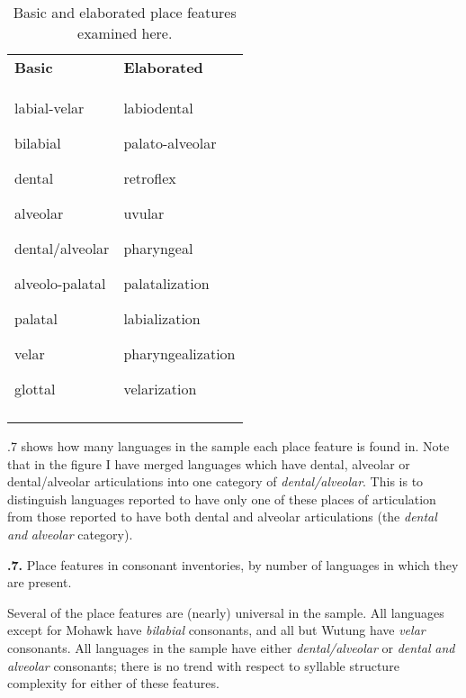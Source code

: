 \begin{table}
\begin{tabularx}{\textwidth}{XX}
\lsptoprule

\textbf{Basic} & \textbf{Elaborated}\\
labial-velar

bilabial

dental

alveolar

dental/alveolar

alveolo-palatal

palatal

velar

glottal & labiodental

palato-alveolar

retroflex

uvular

pharyngeal

palatalization

labialization

pharyngealization

velarization\\
\lspbottomrule
\end{tabularx}
\caption{\label{4.13}Basic and elaborated place features examined here.}
\end{table}

  .7 shows how many languages in the sample each place feature is found in. Note that in the figure I have merged languages which have dental, alveolar or dental/alveolar articulations into one category of \textit{dental/alveolar}. This is to distinguish languages reported to have only one of these places of articulation from those reported to have both dental and alveolar articulations (the \textit{dental} \textit{and} \textit{alveolar} category).

\textbf{.7.} Place features in consonant inventories, by number of languages in which they are present.

  Several of the place features are (nearly) universal in the sample. All languages except for Mohawk have \textit{bilabial} consonants, and all but Wutung have \textit{velar} consonants. All languages in the sample have either \textit{dental/alveolar} or \textit{dental} \textit{and} \textit{alveolar} consonants; there is no trend with respect to syllable structure complexity for either of these features.

